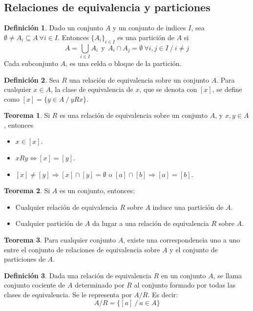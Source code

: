 \documentclass[10pt]{article}
\theoremstyle{definition}
\newtheorem{definition}{Definición}[section]
\newtheorem{theorem}{Teorema}[section]
\begin{document}
    \subsection{Relaciones de equivalencia y particiones}
    \begin{definition}
        Dado un conjunto $A$ y un conjunto de indices $I$, sea $\emptyset\neq A_i \subseteq A\ \forall i\in I$. Entonces $\{A_i\}_{i\in I}$ es una partición de $A$ si $$A=\bigcup _{i\in I} A_{i} \ \ \text{y} \ \ A_{i} \cap A_{j} =\emptyset \ \forall i,j\in I\ /\ i\neq j$$
        Cada subconjunto $A$, es una celda o bloque de la partición.
    \end{definition}
    \begin{definition}
        Sea $R$ una relación de equivalencia sobre un conjunto $A$. Para cualquier $x\in A$, la clase de equivalencia de $x$, que se denota con $[x]$, se define como $[x]=\{y\in A\ /\ yRx\}$.
    \end{definition}
    \begin{theorem}
        Si $R$ es una relación de equivalencia sobre un conjunto $A$, y $x,y\in A$, entonces
        \begin{itemize}
            \item $x\in [x]$.
            \item $xRy \Leftrightarrow [x]=[y]$.
            \item $[x]\neq[y]\Rightarrow [x]\cap[y]=\emptyset$ o $[a]\cap[b]\Rightarrow [a]=[b]$.
        \end{itemize}
    \end{theorem}
    \begin{theorem}
        Si $A$ es un conjunto, entonces:
        \begin{itemize}
            \item Cualquier relación de equivalencia $R$ sobre $A$ induce una partición de $A$.
            \item Cualquier partición de $A$ da lugar a una relación de equivalencia $R$ sobre $A$.
        \end{itemize}
    \end{theorem}
    \begin{theorem}
        Para cualquier conjunto $A$, existe una correspondencia uno a uno entre el conjunto de relaciones de equivalencia sobre $A$ y el conjunto de particiones de $A$.
    \end{theorem}
    \begin{definition}
        Dada una relación de equivalencia $R$ en un conjunto $A$, se llama conjunto cociente de $A$ determinado por $R$ al conjunto formado por todas las clases de equivalencia. Se le representa por $A/R$. Es decir:$$A/R=\{[a] \ /\ a\in A\}$$
    \end{definition}
\end{document}
